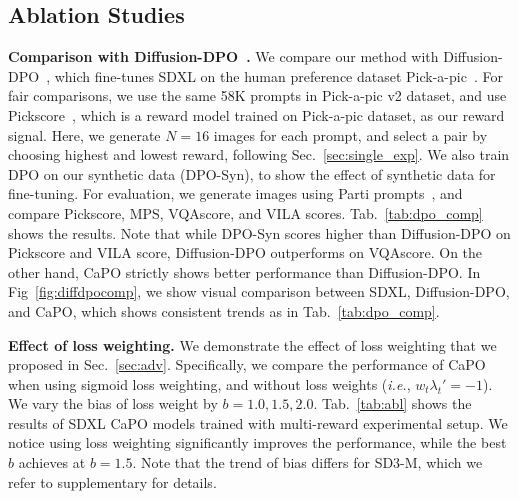 \subsection{Ablation Studies}
\noindent
{\bf Comparison with Diffusion-DPO~\citep{wallace2023diffusion}.} 
We compare our method with Diffusion-DPO~\citep{wallace2023diffusion}, which fine-tunes SDXL on the human preference dataset Pick-a-pic~\citep{kirstain2023pick}.
For fair comparisons, we use the same 58K prompts in Pick-a-pic v2 dataset, and use Pickscore~\citep{kirstain2023pick}, which is a reward model trained on Pick-a-pic dataset, as our reward signal.
Here, we generate $N=16$ images for each prompt, and select a pair by choosing highest and lowest reward, following Sec.~\ref{sec:single_exp}.
We also train DPO on our synthetic data (DPO-Syn), to show the effect of synthetic data for fine-tuning. 
For evaluation, we generate images using Parti prompts~\citep{yu2022scaling}, and compare Pickscore, MPS, VQAscore, and VILA scores. 
Tab.~\ref{tab:dpo_comp} shows the results. 
Note that while DPO-Syn scores higher than Diffusion-DPO on Pickscore and VILA score, Diffusion-DPO outperforms on VQAscore. 
On the other hand, CaPO strictly shows better performance than Diffusion-DPO. In Fig~\ref{fig:diffdpocomp}, we show visual comparison between SDXL, Diffusion-DPO, and CaPO, which shows consistent trends as in Tab.~\ref{tab:dpo_comp}.




\vspace{1mm}
\noindent
{\bf Effect of loss weighting.} 
We demonstrate the effect of loss weighting that we proposed in Sec.~\ref{sec:adv}. Specifically, we compare the performance of CaPO when using sigmoid loss weighting, and without loss weights (\emph{i.e.}, $w_t\lambda_t' = -1$). We vary the bias of loss weight by $b=1.0, 1.5, 2.0$. 
Tab.~\ref{tab:abl} shows the results of SDXL CaPO models trained with multi-reward experimental setup. We notice using loss weighting significantly improves the performance, while the best $b$ achieves at $b=1.5$. 
Note that the trend of bias differs for SD3-M, which we refer to supplementary for details.


